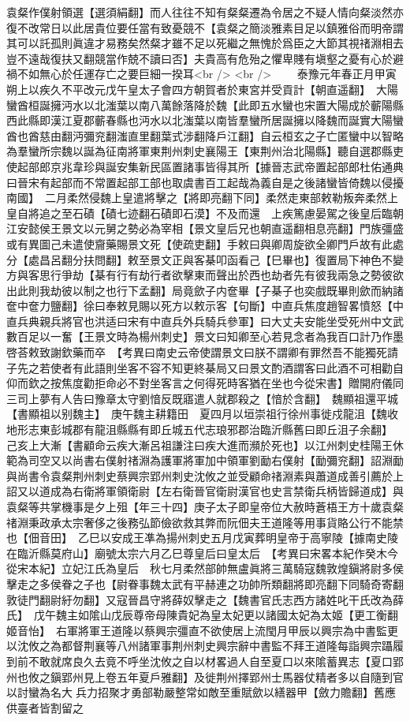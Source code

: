 袁粲作僕射領選【選須絹翻】而人往往不知有粲粲遷為令居之不疑人情向粲淡然亦復不改常日以此居貴位要任當有致憂競不【袁粲之簡淡雅素目足以鎮雅俗而明帝謂其可以託孤則眞違才易務矣然粲才雖不足以死繼之無愧於爲臣之大節其視禇淵相去豈不遠哉復扶又翻競當作兢不讀曰否】夫貴高有危殆之懼卑賤有塡壑之憂有心於避禍不如無心於任運存亡之要巨細一揆耳<br />
<br />
　　泰豫元年春正月甲寅朔上以疾久不平改元戊午皇太子會四方朝賀者於東宮并受貢計【朝直遥翻】　大陽蠻酋桓誕擁沔水以北滍葉以南八萬餘落降於魏【此即五水蠻也宋置大陽成於蘄陽縣西此縣即漢江夏郡蘄春縣也沔水以北滍葉以南皆羣蠻所居誕擁以降魏而誕實大陽蠻酋也酋慈由翻沔彌兖翻滍直里翻葉式涉翻降戶江翻】自云桓玄之子亡匿蠻中以智略為羣蠻所宗魏以誕為征南將軍東荆州刺史襄陽王【東荆州治北陽縣】聽自選郡縣吏使起部郎京兆韋珍與誕安集新民區置諸事皆得其所【據晉志武帝置起部郎杜佑通典曰晉宋有起部而不常置起部工部也取虞書百工起哉為義自是之後諸蠻皆倚魏以侵擾南國】　二月柔然侵魏上皇遣將擊之【將即亮翻下同】柔然走東部敕勒叛奔柔然上皇自將追之至石磧【磧七迹翻石磧即石漠】不及而還　上疾篤慮晏駕之後皇后臨朝江安懿侯王景文以元舅之勢必為宰相【景文皇后兄也朝直遥翻相息亮翻】門族彊盛或有異圖己未遣使齎藥賜景文死【使疏吏翻】手敕曰與卿周旋欲全卿門戶故有此處分【處昌呂翻分扶問翻】敕至景文正與客棊叩函看己【巳畢也】復置局下神色不變方與客思行爭劫【棊有行有劫行者欲擊東而聲出於西也劫者先有彼我兩急之勢彼欲出此則我劫彼以制之也行下孟翻】局竟歛子内奩畢【子棊子也奕戲既畢則歛而納諸奩中奩力鹽翻】徐曰奉敕見賜以死方以敕示客【句斷】中直兵焦度趙智畧憤怒【中直兵典親兵將官也洪适曰宋有中直兵外兵騎兵參軍】曰大丈夫安能坐受死州中文武數百足以一奮【王景文時為楊州刺史】景文曰知卿至心若見念者為我百口計乃作墨啓荅敕致謝欽藥而卒　【考異曰南史云帝使謂景文曰朕不謂卿有罪然吾不能獨死請子先之若使者有此語則坐客不容不知更終棊局又曰景文酌酒謂客曰此酒不可相勸自仰而欽之按焦度勸拒命必不對坐客言之何得死時客猶在坐也今從宋書】贈開府儀同三司上夢有人告曰豫章太守劉愔反既寤遣人就郡殺之【愔於含翻】　魏顯祖還平城【書顯祖以别魏主】　庚午魏主耕籍田　夏四月以垣崇祖行徐州事徙戍龍沮【魏收地形志東彭城郡有龍沮縣縣有即丘城五代志琅邪郡治臨沂縣舊曰即丘沮子余翻】　己亥上大漸【書顧命云疾大漸呂祖謙注曰疾大進而瀕於死也】以江州刺史桂陽王休範為司空又以尚書右僕射禇淵為護軍將軍加中領軍劉勔右僕射【勔彌兖翻】詔淵勔與尚書令袁粲荆州刺史蔡興宗郢州刺史沈攸之並受顧命禇淵素與蕭道成善引薦於上詔又以道成為右衛將軍領衛尉【左右衛晉官衛尉漢官也史言禁衛兵柄皆歸道成】與袁粲等共掌機事是夕上殂【年三十四】庚子太子即皇帝位大赦時蒼梧王方十歲袁粲禇淵秉政承太宗奢侈之後務弘節儉欲救其弊而阮佃夫王道隆等用事貨賂公行不能禁也【佃音田】　乙巳以安成王凖為揚州刺史五月戊寅葬明皇帝于高寧陵【據南史陵在臨沂縣莫府山】廟號太宗六月乙巳尊皇后曰皇太后　【考異曰宋畧本紀作癸木今從宋本紀】立妃江氏為皇后　秋七月柔然部帥無盧眞將三萬騎寇魏敦煌鎭將尉多侯擊走之多侯眷之子也【尉眷事魏太武有平赫連之功帥所類翻將即亮翻下同騎奇寄翻敦徒門翻尉紆勿翻】又寇晉昌守將薛奴擊走之【魏書官氏志西方諸姓叱干氏改為薛氏】　戊午魏主如隂山戊辰尊帝母陳貴妃為皇太妃更以諸國太妃為太姬【更工衡翻姬音怡】　右軍將軍王道隆以蔡興宗彊直不欲使居上流閠月甲辰以興宗為中書監更以沈攸之為都督荆襄等八州諸軍事荆州刺史興宗辭中書監不拜王道隆每詣興宗躡履到前不敢就席良久去竟不呼坐沈攸之自以材畧過人自至夏口以來隂蓄異志【夏口郢州也攸之鎭郢州見上卷五年夏戶雅翻】及徙荆州擇郢州士馬器仗精者多以自隨到官以討蠻為名大兵力招聚才勇部勒嚴整常如敵至重賦歛以繕器甲【斂力贍翻】舊應供臺者皆割留之